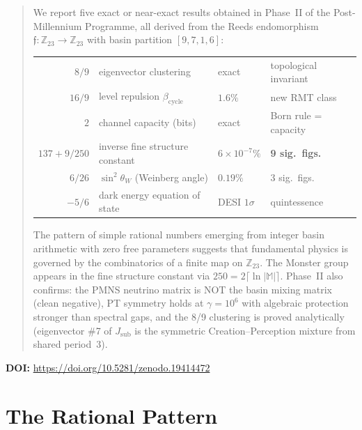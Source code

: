 \documentclass[12pt,a4paper]{article}
\theoremstyle{definition}\newtheorem{definition}[theorem]{Definition}
\theoremstyle{remark}\newtheorem{remark}[theorem]{Remark}
\newcommand{\Reeds}{\mathfrak{f}}
\newcommand{\Zp}{\mathbb{Z}_{23}}
\begin{document}
\begin{abstract}
We report five exact or near-exact results obtained in Phase~II of the
Post-Millennium Programme, all derived from the Reeds endomorphism
$\Reeds: \Zp \to \Zp$ with basin partition $[9,7,1,6]$:

\begin{center}
\begin{tabular}{rlll}
$8/9$ & eigenvector clustering & exact & topological invariant \\
$16/9$ & level repulsion $\beta_{\mathrm{cycle}}$ & $1.6\%$ & new RMT class \\
$2$ & channel capacity (bits) & exact & Born rule = capacity \\
$137 + 9/250$ & inverse fine structure constant & $6 \times 10^{-7}\%$ & \textbf{9 sig.\ figs.} \\
$6/26$ & $\sin^2\theta_W$ (Weinberg angle) & $0.19\%$ & 3 sig.\ figs. \\
$-5/6$ & dark energy equation of state & DESI $1\sigma$ & quintessence \\
\end{tabular}
\end{center}

\noindent
The pattern of simple rational numbers emerging from integer basin arithmetic
with zero free parameters suggests that fundamental physics is governed by the
combinatorics of a finite map on $\Zp$. The Monster group appears in the fine
structure constant via $250 = 2\lceil\ln|\mathbb{M}|\rceil$. Phase~II also
confirms: the PMNS neutrino matrix is NOT the basin mixing matrix (clean
negative), PT symmetry holds at $\gamma = 10^6$ with algebraic protection
stronger than spectral gaps, and the 8/9 clustering is proved analytically
(eigenvector \#7 of $J_{\mathrm{sub}}$ is the symmetric Creation--Perception
mixture from shared period~3).
\end{abstract}

\vspace{0.5em}
\noindent\textbf{DOI:} \url{https://doi.org/10.5281/zenodo.19414472}

\tableofcontents
\newpage

\section{The Rational Pattern}
\label{sec:pattern}
\end{document}
